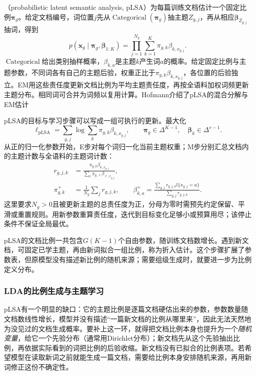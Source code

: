 （probabilistic latent semantic analysis, pLSA）为每篇训练文档估计一个固定比例$\bm\pi_g$。给定文档编号，词位置$j$先从$\operatorname{Categorical}(\bm\pi_g)$抽主题$Z_{g,j}$，再从相应$\bm\beta_{Z_{g,j}}$抽词，得到
\begin{equation}
  \label{eq:pgm-static-directed-plsa}
  p(\bm{x}_g\mid\bm{\pi}_g,\bm{\beta}_{1:K})
    =\prod_{j=1}^{N_g}
       \sum_{k=1}^{K}\pi_{g,k}\beta_{k,x_{g,j}}.
\end{equation}
$\operatorname{Categorical}$给出类别抽样概率，$\beta_{k,a}$是主题$k$产生词$a$的概率。给定固定比例与主题参数，不同词各有自己的主题后验，权重正比于$\pi_{g,k}\beta_{k,x_{g,j}}$，各位置的后验独立。EM用这些责任度更新文档比例为平均主题责任度，再按全语料加权词频更新主题分布。相同词可合并为词频以复用计算。Hofmann介绍了pLSA的混合分解与EM估计

pLSA的目标与学习步骤可以写成一组可执行的更新。最大化
\begin{equation}
 \ell_{\mathrm{pLSA}}=\sum_{g,j}\log\sum_k\pi_{g,k}\beta_{k,x_{g,j}},
 \qquad \bm\pi_g\in\Delta^{K-1},\quad\bm\beta_k\in\Delta^{v-1}.
 \label{eq:pgm-static-directed-plsa-objective}
\end{equation}
从正的归一化参数开始，E步对每个词归一化当前主题权重；M步分别汇总文档内的主题计数与全语料的主题词计数：
\[
 \begin{aligned}
 r_{g,j,k}&=\frac{\pi_{g,k}\beta_{k,x_{g,j}}}
                   {\sum_\ell\pi_{g,\ell}\beta_{\ell,x_{g,j}}},\\
 \pi_{g,k}^+&=\frac1{N_g}\sum_jr_{g,j,k},\qquad
 \beta_{k,a}^+=\frac{\sum_{g,j}r_{g,j,k}\mathbb I\{x_{g,j}=a\}}
                         {\sum_{g,j}r_{g,j,k}}.
 \end{aligned}
\]
这里要求$N_g>0$且被更新主题的总责任度为正，分母为零时需预先约定保留、平滑或重置规则。用新参数重算责任度，迭代到目标变化足够小或预算用尽；该停止条件不保证全局最优。

pLSA的文档比例一共包含$G(K-1)$个自由参数，随训练文档数增长。遇到新文档，可固定已学主题，再由新词拟合一组比例，称为折入估计。这个步骤扩展了参数表，但原模型没有描述新比例的随机来源；需要组级生成时，就要进一步为比例定义分布。

\subsubsection{LDA的比例生成与主题学习}
\label{sec:pgm-static-directed-lda-model}

pLSA有一个明显的缺口：它的主题比例是逐篇文档硬估出来的参数，参数数量随文档数线性增长，模型并没有描述“一篇新文档的比例从哪里来”，因此无法天然地为没见过的文档生成概率。要补上这一环，就得把文档比例本身也提升为一个\emph{随机变量}，给它一个先验分布（通常用Dirichlet分布）；新文档先从这个先验抽出比例，再依据实际看到的词把比例的后验收缩。新文档没有已拟合的比例表项。若希望模型在读取新词之前就能生成一篇文档，需要给比例本身安排随机来源，再用新词修正这份不确定性。

